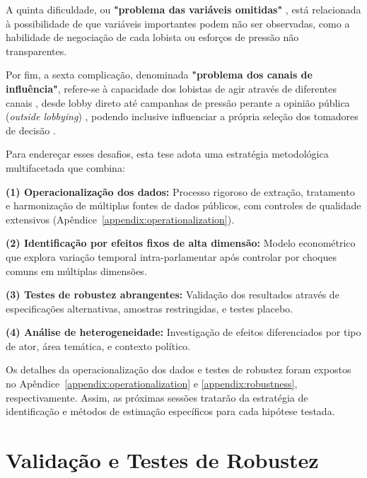 A quinta dificuldade, ou \textbf{"problema das variáveis omitidas"} \cite{de_figueiredo_advancing_2014}, está relacionada à possibilidade de que variáveis importantes podem não ser observadas, como a habilidade de negociação de cada lobista ou esforços de pressão não transparentes.

Por fim, a sexta complicação, denominada \textbf{"problema dos canais de influência"}, refere-se à capacidade dos lobistas de agir através de diferentes canais \cite{dur_measuring_2008}, desde lobby direto até campanhas de pressão perante a opinião pública (\textit{outside lobbying}) \cite{kollman1998outside}, podendo inclusive influenciar a própria seleção dos tomadores de decisão \cite{fordham2003selection}.

Para endereçar esses desafios, esta tese adota uma estratégia metodológica multifacetada que combina:

\textbf{(1) Operacionalização dos dados:} Processo rigoroso de extração, tratamento e harmonização de múltiplas fontes de dados públicos, com controles de qualidade extensivos (Apêndice~\ref{appendix:operationalization}).

\textbf{(2) Identificação por efeitos fixos de alta dimensão:} Modelo econométrico que explora variação temporal intra-parlamentar após controlar por choques comuns em múltiplas dimensões.

\textbf{(3) Testes de robustez abrangentes:} Validação dos resultados através de especificações alternativas, amostras restringidas, e testes placebo.

\textbf{(4) Análise de heterogeneidade:} Investigação de efeitos diferenciados por tipo de ator, área temática, e contexto político.

Os detalhes da operacionalização dos dados e testes de robustez foram expostos no Apêndice~\ref{appendix:operationalization} e \ref{appendix:robustness}, respectivamente. Assim, as próximas sessões tratarão da estratégia de identificação e métodos de estimação específicos para cada hipótese testada.






\section{Validação e Testes de Robustez}

